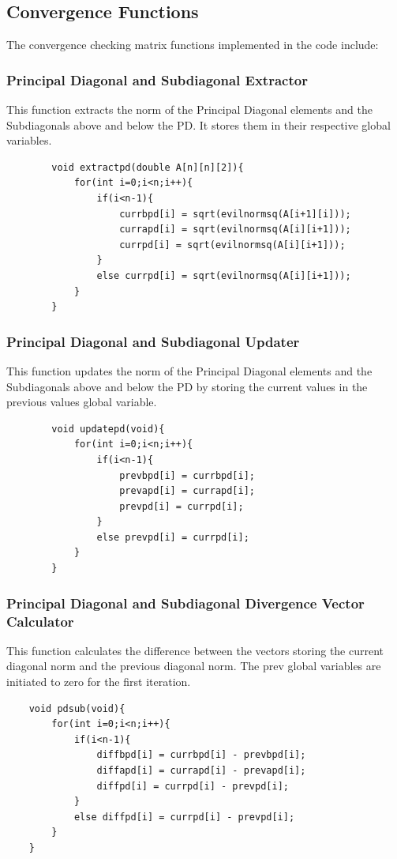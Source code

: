 \documentclass[12pt]{article}
\begin{document}
	\subsection{Convergence Functions}
	The convergence checking matrix functions implemented in the code include:
	
	\subsubsection{Principal Diagonal and Subdiagonal Extractor}
	This function extracts the norm of the Principal Diagonal elements and the Subdiagonals above and below the PD. It stores them in their respective global variables.
	\begin{lstlisting}
		void extractpd(double A[n][n][2]){
			for(int i=0;i<n;i++){
				if(i<n-1){
					currbpd[i] = sqrt(evilnormsq(A[i+1][i]));
					currapd[i] = sqrt(evilnormsq(A[i][i+1]));
					currpd[i] = sqrt(evilnormsq(A[i][i+1]));
				} 
				else currpd[i] = sqrt(evilnormsq(A[i][i+1]));
			}
		}
	\end{lstlisting}
		\subsubsection{Principal Diagonal and Subdiagonal Updater}
	This function updates the norm of the Principal Diagonal elements and the Subdiagonals above and below the PD by  storing the current values in the previous values global variable.
	\begin{lstlisting}
		void updatepd(void){
			for(int i=0;i<n;i++){
				if(i<n-1){
					prevbpd[i] = currbpd[i];
					prevapd[i] = currapd[i];
					prevpd[i] = currpd[i];
				} 
				else prevpd[i] = currpd[i];
			}
		}
	\end{lstlisting}
		\subsubsection{Principal Diagonal and Subdiagonal Divergence Vector Calculator}
This function calculates the difference between the vectors storing the current diagonal norm and the previous diagonal norm.  The prev global variables are initiated to zero for the first iteration.
\begin{lstlisting}
	void pdsub(void){
		for(int i=0;i<n;i++){
			if(i<n-1){
				diffbpd[i] = currbpd[i] - prevbpd[i];
				diffapd[i] = currapd[i] - prevapd[i];
				diffpd[i] = currpd[i] - prevpd[i];
			}
			else diffpd[i] = currpd[i] - prevpd[i];
		}
	}
\end{lstlisting}
\end{document}
